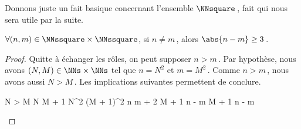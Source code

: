 Donnons juste un fait basique concernant l'ensemble $\NNsquare$\,, fait qui nous sera utile par la suite.




\begin{fact} \label{dist-square}
	$\forall (n, m) \in \NNssquare \times \NNssquare$, 
	si $n \neq m$\,, alors $\abs{n - m} \geq 3$\,.
\end{fact}

\begin{proof}
	Quitte à échanger les rôles, on peut supposer $n > m$\,.
	Par hypothèse, nous avons $(N, M) \in \NNs \times \NNs$ tel que $n = N^2$ et $m = M^2$\,.
	Comme $n > m$\,, nous avons aussi $N > M$\,. 
	Les implications suivantes permettent de conclure.
	
	\medskip
	
	\begin{stepcalc}[style = ar*, ope = \implies]
		N > M
	\explnext{}
		N \geq M + 1
	\explnext{}
		N^2 \geq (M + 1)^2
	\explnext{}
		n \geq m + 2 M + 1
	\explnext{}
		n - m  M + 1
	\explnext{}
		n - m 
	\end{stepcalc}
	
	\leavevmode
\end{proof}

